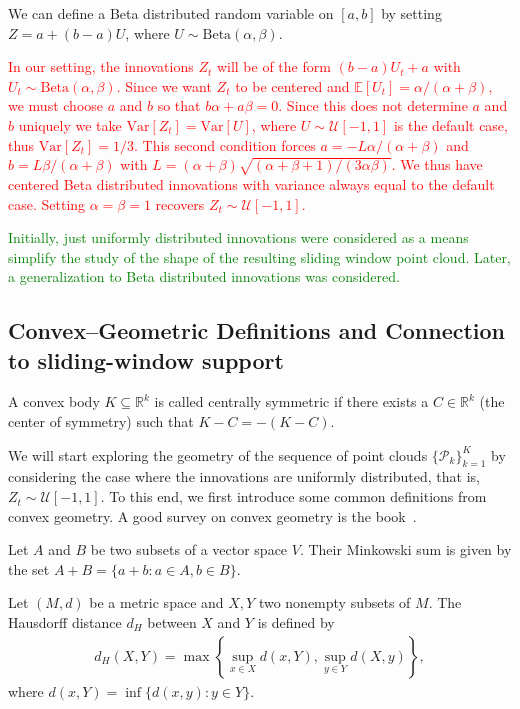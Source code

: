 We can define a Beta distributed random variable on $[a,b]$ by setting $Z=a+(b-a)U$, where $U\sim\text{Beta}(\alpha,\beta)$.

\textcolor{red}{In our setting, the innovations $Z_t$ will be of the form $(b-a)U_t+a$ with $U_t\sim\text{Beta}(\alpha,\beta)$. Since we want $Z_t$ to be centered and $\mathbb{E}[U_t]=\alpha/(\alpha+\beta)$, we must choose $a$ and $b$ so that $b\alpha+a\beta=0$. Since this does not determine $a$ and $b$ uniquely we take $\text{Var}[Z_t]=\text{Var}[U]$, where $U\sim\mathcal{U}[-1,1]$ is the default case, thus $\text{Var}[Z_t]=1/3$. This second condition forces $a=-L\alpha/(\alpha+\beta)$ and $b=L\beta/(\alpha+\beta)$ with $L=(\alpha+\beta)\sqrt{(\alpha+\beta+1)/(3\alpha\beta)}$. We thus have centered Beta distributed innovations with variance always equal to the default case. Setting $\alpha=\beta=1$ recovers $Z_t\sim\mathcal{U}[-1,1]$.}

\textcolor{green}{Initially, just uniformly distributed innovations were considered as a means simplify the study of the shape of the resulting sliding window point cloud. Later, a generalization to Beta distributed innovations was considered.}

\subsection{Convex--Geometric Definitions and Connection to sliding-window support}

A convex body $K\subseteq\mathbb{R}^k$ is called centrally symmetric if there exists a $C\in\mathbb{R}^{k}$ (the center of symmetry) such that $K-C=-(K-C)$.

We will start exploring the geometry of the sequence of point clouds $\{\mathcal{P}_k\}_{k=1}^{K}$ by considering the case where the innovations are uniformly distributed, that is, $Z_t\sim\mathcal{U}[-1,1]$. To this end, we first introduce some common definitions from convex geometry. A good survey on convex geometry is the book~\cite{gruber1993handbook}.

\begin{Def}
    Let $A$ and $B$ be two subsets of a vector space $V$. Their Minkowski sum is given by the set $A+B=\{a+b:a\in A,b\in B\}$.
\end{Def}

\begin{Def}
    Let $(M,d)$ be a metric space and $X,Y$ two nonempty subsets of $M$. The Hausdorff distance $d_H$ between $X$ and $Y$ is defined by
    \begin{align*}
        d_H(X,Y)=\max\left\{\sup_{x\in X}d(x,Y),\sup_{y\in Y}d(X,y)\right\},
    \end{align*}
    where $d(x,Y)=\inf\{d(x,y):y\in Y\}$.
\end{Def}

